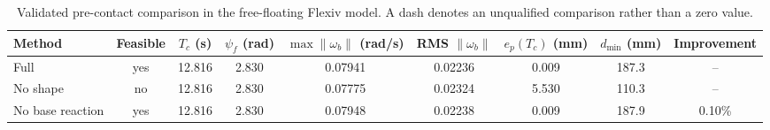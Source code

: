 \begin{table}[t]
\centering
\caption{Validated pre-contact comparison in the free-floating Flexiv model. A dash denotes an unqualified comparison rather than a zero value.}
\label{tab:precontact_comparison}
\begin{tabular}{lcccccccc}
\toprule
Method & Feasible & $T_c$ (s) & $\psi_f$ (rad) & $\max\|\omega_b\|$ (rad/s) & RMS $\|\omega_b\|$ & $e_p(T_c)$ (mm) & $d_{\min}$ (mm) & Improvement \\
\midrule
Full & yes & 12.816 & 2.830 & 0.07941 & 0.02236 & 0.009 & 187.3 & -- \\
No shape & no & 12.816 & 2.830 & 0.07775 & 0.02324 & 5.530 & 110.3 & -- \\
No base reaction & yes & 12.816 & 2.830 & 0.07948 & 0.02238 & 0.009 & 187.9 & 0.10\% \\
\bottomrule
\end{tabular}
\end{table}
